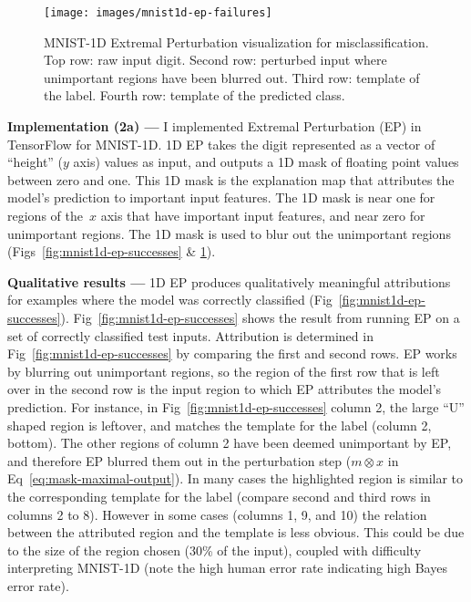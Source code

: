 \documentclass{article}
\newcommand{\myparagraph}[1]{\noindent\textbf{#1 ---}}
\begin{document}
\begin{figure}[ht]
	\texttt{[image: images/mnist1d-ep-failures]}
	\caption{\label{fig:mnist1d-ep-failures}MNIST-1D Extremal Perturbation visualization for misclassification.
		Top row: raw input digit.
		Second row: perturbed input where unimportant regions have been blurred out.
		Third row: template of the label.
		Fourth row: template of the predicted class.}
\end{figure}

\myparagraph{Implementation (2a)} I implemented Extremal Perturbation (EP) in TensorFlow for MNIST-1D\@.
1D EP takes the digit represented as a vector of ``height'' ($y$ axis) values as input, and outputs a 1D mask of floating point values between zero and one.
This 1D mask is the explanation map that attributes the model's prediction to important input features.
The 1D mask is near one for regions of the~$x$ axis that have important input features, and near zero for unimportant regions.
The 1D mask is used to blur out the unimportant regions (Figs~\ref{fig:mnist1d-ep-successes} \& \ref{fig:mnist1d-ep-failures}).

\label{sec:mnist1d-qualitative}
\myparagraph{Qualitative results} 1D EP produces qualitatively meaningful attributions for examples where the model was correctly classified (Fig~\ref{fig:mnist1d-ep-successes}).
Fig~\ref{fig:mnist1d-ep-successes} shows the result from running EP on a set of correctly classified test inputs.
Attribution is determined in Fig~\ref{fig:mnist1d-ep-successes} by comparing the first and second rows.
EP works by blurring out unimportant regions, so the region of the first row that is left over in the second row is the input region to which EP attributes the model's prediction.
For instance, in Fig~\ref{fig:mnist1d-ep-successes} column 2, the large ``U'' shaped region is leftover, and matches the template for the label (column 2, bottom).
The other regions of column 2 have been deemed unimportant by EP, and therefore EP blurred them out in the perturbation step ($m\otimes x$ in Eq~\ref{eq:mask-maximal-output}).
In many cases the highlighted region is similar to the corresponding template for the label (compare second and third rows in columns 2 to 8).
However in some cases (columns 1, 9, and 10) the relation between the attributed region and the template is less obvious.
This could be due to the size of the region chosen (30\% of the input), coupled with difficulty interpreting MNIST-1D (note the high human error rate indicating high Bayes error rate).
\end{document}
